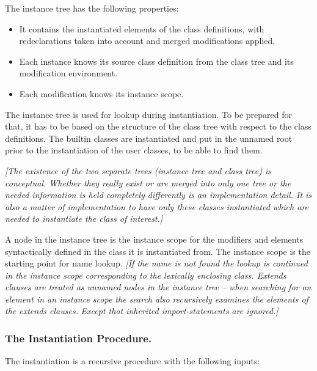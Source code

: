 The instance tree has the following properties:

\begin{itemize}
\item
  It contains the instantiated elements of the class definitions, with
  redeclarations taken into account and merged modifications applied.
\end{itemize}

\begin{itemize}
\item
  Each instance knows its source class definition from the class tree
  and its modification environment.
\item
  Each modification knows its instance scope.
\end{itemize}

The instance tree is used for lookup during instantiation. To be
prepared for that, it has to be based on the structure of the class tree
with respect to the class definitions. The builtin classes are
instantiated and put in the unnamed root prior to the instantiation of
the user classes, to be able to find them.

\emph{{[}The existence of the two separate trees (instance tree and
class tree) is conceptual. Whether they really exist or are merged into
only one tree or the needed information is held completely differently
is an implementation detail. It is also a matter of implementation to
have only these classes instantiated which are needed to instantiate the
class of interest.{]} }

A node in the instance tree is the instance scope for the modifiers and
elements syntactically defined in the class it is instantiated from. The
instance scope is the starting point for name lookup. \emph{{[}If the
name is not found the lookup is continued in the instance scope
corresponding to the lexically enclosing class. Extends clauses are
treated as unnamed nodes in the instance tree -- when searching for an
element in an instance scope the search also recursively examines the
elements of the extends clauses.} \emph{Except that inherited
import-statements are ignored.{]}}

\subsubsection{The Instantiation Procedure.}

The instantiation is a recursive procedure with the following inputs:

